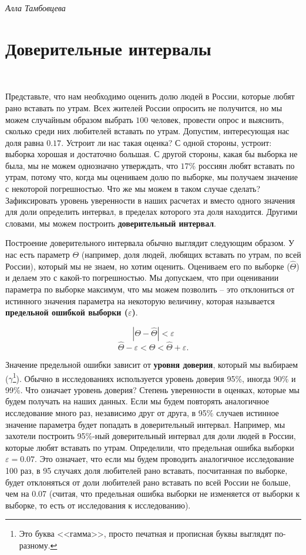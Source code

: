 \documentclass[a4paper,12pt]{extarticle}
\begin{document}
\noindent\textit{Алла Тамбовцева}
\section*{Доверительные интервалы}
\ \ \par
Представьте, что нам необходимо оценить долю людей в России, 
которые любят рано вставать по утрам. Всех жителей России опросить 
не получится, но мы можем случайным образом выбрать $100$ человек, 
провести опрос и выяснить, сколько среди них любителей вставать по 
утрам. Допустим, интересующая нас доля равна $0.17$. Устроит ли нас 
такая оценка? С одной стороны, устроит: выборка хорошая и 
достаточно большая. С другой стороны, какая бы выборка не была, 
мы не можем однозначно утверждать, что $17$\% россиян любят 
вставать по утрам, потому что, когда мы оцениваем долю по 
выборке, мы получаем значение с некоторой погрешностью. 
Что же мы можем в таком случае сделать? Зафиксировать уровень 
уверенности в наших расчетах и вместо одного значения для доли 
определить интервал, в пределах которого эта доля находится. 
Другими словами, мы можем построить 
\textbf{доверительный интервал}.

Построение доверительного интервала обычно выглядит 
следующим образом. У нас есть параметр $\Theta$ (например, 
доля людей, любящих вставать по утрам, по всей России), 
который мы не знаем, но хотим оценить. Оцениваем его по 
выборке ($\hat{\Theta}$) и делаем это с какой-то погрешностью. 
Мы допускаем, что при оценивании параметра по выборке максимум, 
что мы можем позволить -- это отклониться от истинного значения 
параметра на некоторую величину, которая называется 
\textbf{предельной ошибкой выборки ($\varepsilon$)}. 

$$ 
|\Theta - \hat{\Theta}| < \varepsilon$$  $$ \hat{\Theta} - \varepsilon < \Theta < \hat{\Theta} + \varepsilon.
$$

Значение предельной ошибки зависит от \textbf{уровня доверия}, 
который мы выбираем ($\gamma$\footnote{ Это буква <<гамма>>, 
просто печатная и прописная буквы выглядят по-разному.}). 
Обычно в исследованиях используется уровень доверия 95\%, 
иногда 90\% и 99\%. Что означает уровень доверия? 
Степень уверенности в оценках, которые мы будем получать 
на наших данных. Если мы будем повторять аналогичное 
исследование много раз, независимо друг от друга, в 95\% 
случаев истинное значение параметра будет попадать 
в доверительный интервал. Например, мы захотели построить 
95\%-ный доверительный интервал для доли людей в России, 
которые любят вставать по утрам. Определили, что предельная 
ошибка выборки $\varepsilon=0.07$. Это означает, что если мы 
будем проводить аналогичное исследование 100 раз, в 95 
случаях доля любителей рано вставать, посчитанная по выборке, 
будет отклоняться от доли любителей рано вставать по всей 
России не больше, чем на 0.07 (считая, что предельная 
ошибка выборки не изменяется от выборки к выборке, 
то есть от исследования к исследованию).
\end{document}
